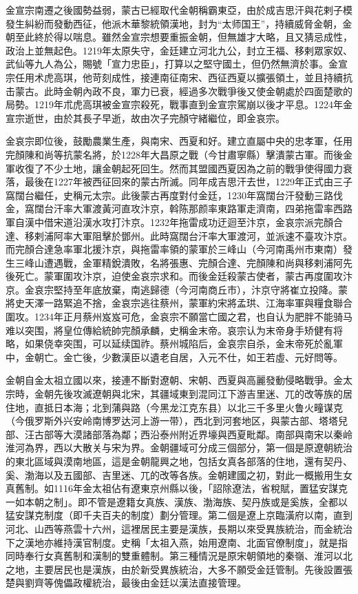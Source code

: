 金宣宗南遷之後國勢益弱，蒙古已經取代金朝稱霸東亞，由於成吉思汗與花剌子模發生糾紛而發動西征，他派木華黎統領漢地，封为“太师国王”，持續威脅金朝，金朝至此終於得以喘息。雖然金宣宗想要重振金朝，但無雄才大略，且又猜忌成性，政治上並無起色。1219年太原失守，金廷建立河北九公，封立王福、移剌眾家奴、武仙等九人為公，賜號「宣力忠臣」，打算以之堅守國土，但仍然無濟於事。金宣宗任用术虎高琪，他苛刻成性，接連南征南宋、西征西夏以擴張領土，並且持續抗击蒙古。此時金朝內政不良，軍力已衰，經過多次戰爭後又使金朝處於四面楚歌的局勢。1219年朮虎高琪被金宣宗殺死，戰事直到金宣宗駕崩以後才平息。1224年金宣宗逝世，由於其長子早逝，故由次子完顏守緒繼位，即金哀宗。

金哀宗即位後，鼓勵農業生產，與南宋、西夏和好。建立直屬中央的忠孝軍，任用完顏陳和尚等抗蒙名將，於1228年大昌原之戰（今甘肅寧縣）擊潰蒙古軍。而後金軍收復了不少土地，讓金朝起死回生。然而其盟國西夏因為之前的戰爭使得國力衰落，最後在1227年被西征回來的蒙古所滅。同年成吉思汗去世，1229年正式由三子窩闊台繼任，史稱元太宗。此後蒙古再度對付金廷，1230年窩闊台汗發動三路伐金，窩闊台汗率大軍渡黃河直攻汴京，斡陈那颜率東路軍走濟南，四弟拖雷率西路軍自漢中借宋道沿漢水攻打汴京。1232年拖雷成功迂迴至汴京，金哀宗派完顏合達、移剌浦阿率大軍阻擊於鄧州。此時窩闊台汗率大軍渡河，並派速不臺攻汴京。而完顏合達急率軍北援汴京，與拖雷率領的蒙軍於三峰山（今河南禹州市東南）發生三峰山遭遇戰，金軍精銳潰敗，名將張惠、完顏合達、完顏陳和尚與移剌浦阿先後死亡。蒙軍圍攻汴京，迫使金哀宗求和。而後金廷殺蒙古使者，蒙古再度圍攻汴京。金哀宗堅持至年底放棄，南逃歸德（今河南商丘市），汴京守將崔立投降。蒙將史天澤一路緊追不捨，金哀宗逃往蔡州，蒙軍約宋將孟珙、江海率軍與糧食聯合圍攻。1234年正月蔡州岌岌可危，金哀宗不願當亡國之君，也自认为肥胖不能骑马难以突围，將皇位傳給統帥完顏承麟，史稱金末帝。哀宗认为末帝身手矫健有将略，如果侥幸突围，可以延续国祚。蔡州城陷后，金哀宗自杀，金末帝死於亂軍中，金朝亡。金亡後，少數漢臣以遺老自居，入元不仕，如王若虛、元好問等。

金朝自金太祖立國以來，接連不斷對遼朝、宋朝、西夏與高麗發動侵略戰爭。金太宗時，金朝先後攻滅遼朝與北宋，其疆域東到混同江下游吉里迷、兀的改等族的居住地，直抵日本海；北到蒲與路（今黑龙江克东县）以北三千多里火鲁火疃谋克（今俄罗斯外兴安岭南博罗达河上游一带），西北到河套地区，與蒙古部、塔塔兒部、汪古部等大漠諸部落為鄰；西沿泰州附近界壕與西夏毗鄰。南部與南宋以秦岭淮河為界，西以大散关与宋为界。金朝疆域可分成三個部分，第一個是原遼朝統治的東北區域與漠南地區，這是金朝龍興之地，包括女真各部落的住地，還有契丹、奚、渤海以及五國部、吉里迷、兀的改等各族。金朝建國之初，對此一概搬用生女真舊制。如1116年金太祖佔有遼東京州縣以後，「詔除遼法，省稅賦，置猛安謀克一如本朝之制」。即不管是遼籍女真族、漢族、渤海族、契丹族或是奚族，全都以猛安謀克制度（即千夫百夫的制度）劃分管理。第二個是遼上京臨潢府以南，直到河北、山西等燕雲十六州，這裡居民主要是漢族，長期以來受異族統治，而金統治下之漢地亦維持漢官制度。史稱「太祖入燕，始用遼南、北面官僚制度」，就是指同時奉行女真舊制和漢制的雙重體制。第三種情況是原宋朝領地的秦嶺、淮河以北之地，主要居民也是漢族，由於新受異族統治，大多不願受金廷管制。先後設置張楚與劉齊等傀儡政權統治，最後由金廷以漢法直接管理。

